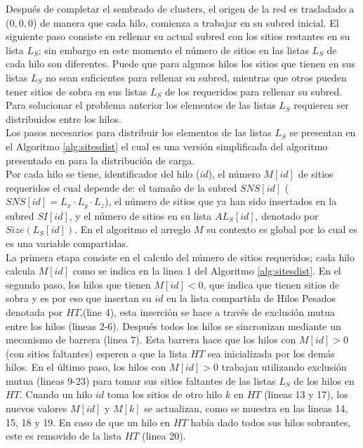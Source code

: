 Después de completar el sembrado de clusters, el origen de la red es trasladado a ($0, 0, 0$) de manera que cada hilo, comienza a trabajar en su subred inicial. El siguiente paso consiste en rellenar su actual subred con los sitios restantes en su lista $L_S$; sin embargo en este momento el número de sitios en las listas $L_S$ de cada hilo son diferentes. Puede que para algunos hilos los sitios que tienen en sus listas $L_S$ no sean suficientes para rellenar su subred, mientras que otros pueden tener sitios de sobra en sus listas $L_S$ de los requeridos para rellenar su subred. Para solucionar el problema anterior los elementos de las listas $L_S$   requieren ser distribuidos entre los hilos.\\

Los pasos necesarios para distribuir los elementos de las listas $L_S$ se presentan en el Algoritmo \ref{alg:sitesdist} el cual es una versión simplificada del algoritmo presentado en \cite{ref11} para la distribución de carga.\\

Por cada hilo se tiene, identificador del hilo ($id$), el número $M[id]$ de sitios requeridos el cual depende de: el tamaño de la subred $SNS[id]$ ($SNS[id] = L_x \cdot L_y \cdot L_z$), el número de sitios que ya han sido insertados en la subred $SI[id]$, y el número de sitios en su lista $AL_S[id]$, denotado por $Size(L_S[id])$. En el algoritmo el arreglo $M$ su contexto es global por lo cual es es una variable compartidas.\\

La primera etapa consiste en el calculo del número de sitios requeridos; cada hilo calcula $M[id]$ como se indica en la linea 1 del Algoritmo \ref{alg:sitesdist}. En el segundo paso, los hilos que tienen $M[id]<0$, que indica que tienen sitios de sobra y es por eso que insertan su $id$ en la lista compartida de Hilos Pesados denotada por $HT$,(line 4), esta inserción se hace a través de exclusión mutua entre los hilos (lineas 2-6). Después todos los hilos se sincronizan mediante un mecanismo de barrera (linea 7). Esta barrera hace que los hilos con $M[id]>0$ (con sitios faltantes) esperen a que la lista $HT$ sea inicializada por los demás hilos. En el último paso, los hilos con $M[id] > 0$ trabajan utilizando exclusión mutua (lineas 9-23) para tomar sus sitios faltantes de las listas $L_S$ de los hilos en $HT$. Cuando un hilo $id$ toma los sitios de otro hilo $k$ en $HT$ (lineas 13 y 17), los nuevos valores $M[id]$ y $M[k]$ se actualizan, como se muestra en las lineas 14, 15, 18 y 19. En caso de que un hilo en $HT$ había dado todos sus hilos sobrantes, este es removido de la lista $HT$ (linea 20).\\

